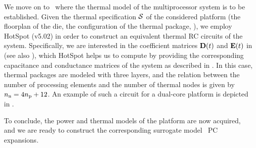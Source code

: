 We move on to \ where the thermal model of the multiprocessor system is to be established.
Given the thermal specification $\mathcal{S}$ of the considered platform (the floorplan of the die, the configuration of the thermal package, \etc), we employ HotSpot (v5.02) \cite{hotspot} in order to construct an equivalent thermal RC circuits of the system.
Specifically, we are interested in the coefficient matrices $\mCF(\t)$ and $\mCS(\t)$ in  (see also ), which HotSpot helps us to compute by providing the corresponding capacitance and conductance matrices of the system as described in .
In this case, thermal packages are modeled with three layers, and the relation between the number of processing elements and the number of thermal nodes is given by ${n_\text{n}} = 4 {n_\text{p}} + 12$.
An example of such a circuit for a dual-core platform is depicted in .

To conclude, the power and thermal models of the platform are now acquired, and we are ready to construct the corresponding surrogate model \via\ PC expansions.
